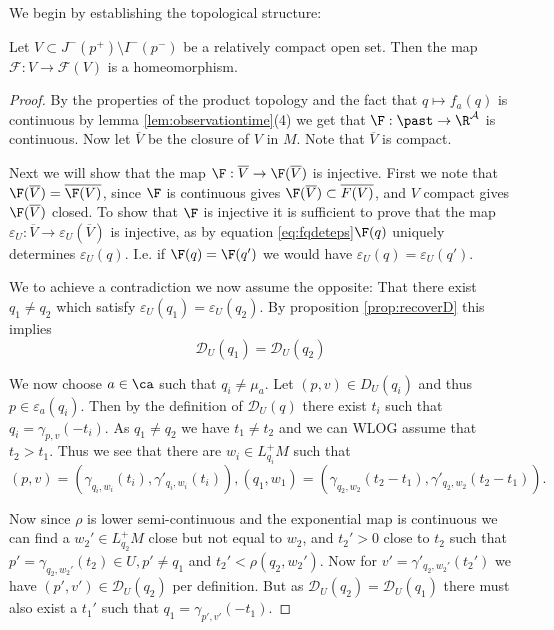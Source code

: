 We begin by establishing the topological structure:
\begin{lemma}\label{lem:Fhomeo}
Let $V\subset J^-(p^+)\setminus I^-(p^-)$ be a relatively compact open set.
Then the map $\mathcal{F}:V\to\mathcal{F}(V)$ is a homeomorphism.
\end{lemma}
\begin{proof}
By the properties of the product topology and the fact that $q\mapsto f_a(q)$ is continuous by lemma \ref{lem:observationtime}(4) we get that $\F:\past\to\R^\mathcal{A}$ is continuous.
Now let $\overline{V}$ be the closure of $V$ in $M$. Note that $\overline{V}$ is compact.

Next we will show that the map $\F:\overline{V}\to\F(\overline{V})$ is injective. First we note that $\F(\overline{V})=\overline{\F(V)}$, since $\F$ is continuous gives $\F(\overline{V}) \subset \overline{F(V)}$, and $V$ compact gives $\F(\overline{V})$ closed. To show that $\F$ is injective it is sufficient to prove that the map $\varepsilon_U:\overline{V}\to\varepsilon_U(\overline{V})$ is injective, as by equation \ref{eq:fqdeteps}$ \F(q)$ uniquely determines $\varepsilon_U(q)$. I.e. if $\F(q)=\F(q')$ we would have $\varepsilon_U(q)=\varepsilon_U(q')$.

We to achieve a contradiction we now assume the opposite: That there exist $q_1\neq q_2$ which satisfy $\varepsilon_U(q_1) = \varepsilon_U(q_2)$. By proposition \ref{prop:recoverD} this implies 
\[
\mathcal{D}_U(q_1) = \mathcal{D}_U(q_2)
\]

We now choose $a\in \ca$ such that $q_i\neq \mu_a$. Let $(p,v)\in D_U(q_i)$ and thus $p\in \varepsilon_a(q_i)$. Then by the definition of $\mathcal{D}_U(q)$ there exist $t_i$ such that $q_i=\gamma_{p,v}(-t_i)$. As $q_1\neq q_2$ we have $t_1\neq t_2$ and we can WLOG assume that $t_2>t_1$. Thus we see that there are $w_i\in L^+_{q_i}M$ such that 
\[
(p,v) = (\gamma_{q_i,w_i}(t_i),\gamma'_{q_i,w_i}(t_i)), (q_1,w_1) = (\gamma_{q_2,w_2}(t_2-t_1),\gamma'_{q_2,w_2}(t_2-t_1)).
\]

Now since $\rho$ is lower semi-continuous and the exponential map is continuous we can find a $w_2'\in L^+_{q_2}M$ close but not equal to $w_2$, and $t_2'>0$ close to $t_2$ such that $p'=\gamma_{q_2,w_2'}(t_2)\in U, p'\neq q_1$ and $t_2'<\rho(q_2,w_2')$. Now for $v'=\gamma'_{q_2,w_2'}(t_2')$ we have $(p',v')\in \mathcal{D}_U(q_2)$ per definition. But as $\mathcal{D}_U(q_2)=\mathcal{D}_U(q_1)$ there must also exist a $t_1'$ such that $q_1=\gamma_{p',v'}(-t_1)$.


\end{proof}
